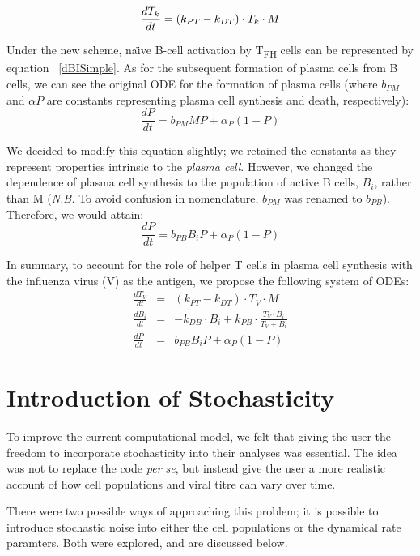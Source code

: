 \documentclass[a4paper, 12pt]{report}
\begin{document}
\begin{equation}
\frac{dT_k}{dt} = (k_{PT}-k_{DT}) \cdot T_k \cdot M \\
\end{equation}

Under the new scheme, na\"\i ve B-cell activation by T\textsubscript{FH} cells can be represented by equation ~\ref{dBISimple}. As for the subsequent formation of plasma cells from B cells, we can see the original ODE for the formation of plasma cells (where $b_{PM}$ and $\alpha{P}$ are constants representing plasma cell synthesis and death, respectively):
\begin{equation}
\frac{dP}{dt} = b_{PM}MP + \alpha_{P}(1 - P)
\end{equation}

We decided to modify this equation slightly; we retained the constants as they represent properties intrinsic to the \emph{plasma cell}. However, we changed the dependence of plasma cell synthesis to the population of active B cells, $B_{i}$, rather than M (\emph{N.B. }To avoid confusion in nomenclature, $b_{PM}$ was renamed to $b_{PB}$). Therefore, we would attain:
\begin{equation}
\frac{dP}{dt} = b_{PB}B_{i}P + \alpha_{P}(1 - P)
\end{equation}

In summary, to account for the role of helper T cells in plasma cell synthesis with the influenza virus (V) as the antigen, we propose the following system of ODEs:
\begin{eqnarray*}
\frac{dT_V}{dt} &=& (k_{PT}-k_{DT}) \cdot T_V \cdot M \\
\frac{dB_i}{dt} &=& -k_{DB} \cdot B_i + k_{PB} \cdot \frac{T_{V} \cdot B_{i}}{T_{V}+B_{i}} \\
\frac{dP}{dt} &=& b_{PB}B_{i}P + \alpha_{P}(1 - P)
\end{eqnarray*}

\section{Introduction of Stochasticity} %
To improve the current computational model, we felt that giving the user the freedom to incorporate stochasticity into their analyses was essential. The idea was not to replace the code \emph{per se}, but instead give the user a more realistic account of how cell populations and viral titre can vary over time. 

There were two possible ways of approaching this problem; it is possible to introduce stochastic noise into either the cell populations or the dynamical rate paramters. Both were explored, and are discussed below.
\end{document}

